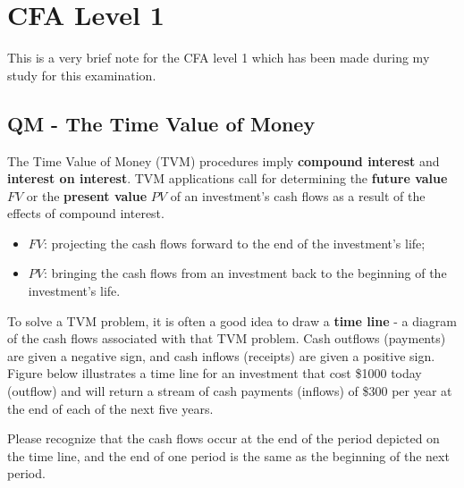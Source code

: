 \chapter{CFA Level 1}
This is a very brief note for the CFA level 1 which has been made during my study for this examination.


\section{QM - The Time Value of Money}
The Time Value of Money (TVM) procedures imply \textbf{compound interest} and \textbf{interest on interest}. TVM applications call for determining the \textbf{future value} $FV$ or the \textbf{present value} $PV$ of an investment's cash flows as a result of the effects of compound interest. 
\begin{itemize}
	\setlength\itemsep{0em}
	\item $FV$: projecting the cash flows forward to the end of the investment's life;
	\item $PV$: bringing the cash flows from an investment back to the beginning of the investment's life.		
\end{itemize}

To solve a TVM problem, it is often a good idea to draw a \textbf{time line} - a diagram of the cash flows associated with that TVM problem. Cash outflows (payments) are given a negative sign, and cash inflows (receipts) are given a positive sign. Figure below illustrates a time line for an investment that cost \$1000 today (outflow) and will return a stream of cash payments (inflows) of \$300 per year at the end of each of the next five years.

\newcommand{\tvma}{{"-1000","+300","+300","+300","+300","+300"}}
\begin{center}
\end{center}

Please recognize that the cash flows occur at the end of the period depicted on the time line, and the end of one period is the same as the beginning of the next period. 



